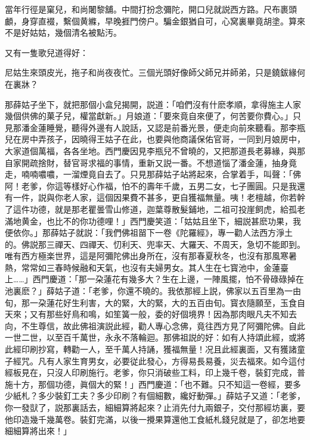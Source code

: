 \begin{myquote}
當年行徑是窠兒，和尚闍黎舖。中間打扮念彌陀，開口兒就説西方路。尺布裹頭顱，身穿直裰，繫個黄縧，早晚捱門傍户。騙金銀猶自可，心窝裏畢竟胡塗。算來不是好姑姑，幾個清名被點汚。
\end{myquote}

又有一隻歌兒道得好：

\begin{myquote}
尼姑生來頭皮光，拖子和尚夜夜忙。三個光頭好像師父師兄并師弟，只是鐃鈸緣何在裏牀？
\end{myquote}

那薛姑子坐下，就把那個小盒兒揭開，説道：「咱們沒有什麽孝順，拿得施主人家幾個供佛的菓子兒，權當獻新。」月娘道：「要來竟自來便了，何苦要你費心。」只見那潘金蓮睡覺，聽得外邊有人說話，又認是前番光景，便走向前來聽看。那李瓶兒在房中弄孩子，因曉得王姑子在此，也要與他商議保佑官哥，一同到月娘房中，大家道個萬福，各各坐地。西門慶因見李瓶兒不曾曉的，又把那道長老募緣，與那自家開疏捨財，替官哥求福的事情，重新又説一番。不想道惱了潘金蓮，抽身竟走，喃喃噥噥，一溜煙竟自去了。只見那薛姑子站將起來，合掌着手，叫聲：「佛阿！老爹，你這等樣好心作福，怕不的壽年千歲，五男二女，七子團圓。只是我還有一件，説與你老人家，這個因果費不甚多，更自獲福無量。咦！老檀越，你若幹了這件功德，就是那老瞿曇雪山修道，迦葉尊散髮鋪地，二祖可投崖飼虎，給孤老滿地黄金，也比不的你功德哩！」西門慶笑道：「姑姑且坐下，細説甚麽功果，我便依你。」那薛姑子就説：「我們佛祖㽞下一卷《陀羅經》，專一勸人法西方淨土的。佛説那三禪天、四禪天、忉利天、兜率天、大羅天、不周天，急切不能即到。唯有西方極楽世界，這是阿彌陀佛出身所在，沒有那春夏秋冬，也沒有那風寒暑熱，常常如三春時候融和天氣，也沒有夫婦男女。其人生在七寳池中，金蓮臺上……」西門慶道：「那一朶蓮花有幾多大？生在上邊，一陣風擺，怕不骨碌碌掉在池裏麽？」薛姑子道：「老爹，你還不曉的。我依那經上説，佛家以五百里為一由旬，那一朶蓮花好生利害，大的緊，大的緊，大的五百由旬。寳衣隨願至，玉食自天來；又有那些好鳥和鳴，如笙簧一般，委的好個境界！因為那肉眼凡夫不知去向，不生尊信，故此佛祖演説此經，勸人專心念佛，竟往西方見了阿彌陀佛。自此一世二世，以至百千萬世，永永不落輪迴。那佛祖説的好：如有人持頌此經，或將此經印刷抄寫，轉勸一人，至千萬人持誦，獲福無量！况且此經裏面，又有獲諸童子經咒。凡有人家生育男女，必要従此發心，方得易長易養，災去福來。如今這付經板見在，只沒人印刷施行。老爹，你只消破些工料，印上幾千卷，裝釘完成，普施十方，那個功德，眞個大的緊！」西門慶道：「也不難。只不知這一卷經，要多少紙札？多少裝釘工夫？多少印刷？有個細數，纔好動彈。」薛姑子又道：「老爹，你一發獃了，説那裏話去，細細算將起來？止消先付九兩銀子，交付那經坊裏，要他印造幾千幾萬卷。裝釘完滿，以後一攪果算還他工食紙札錢兒就是了，卻怎地要細細算將出來！」

